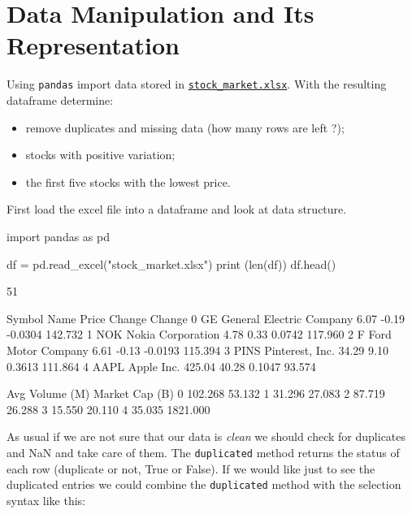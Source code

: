 \chapter{Data Manipulation and Its Representation}
\label{ex-datamanip}

\begin{question}
Using \texttt{pandas} import data stored in \href{https://drive.google.com/file/d/1Uu9lQorvzM-1xwRKPNszaSqlCYAiY-gr/view?usp=sharing}{\texttt{stock\_market.xlsx}}. With the resulting dataframe determine:
\begin{itemize}
\item remove duplicates and missing data (how many rows are left ?);
\item stocks with positive variation;
\item the first five stocks with the lowest price.
\end{itemize}
\end{question}

\begin{solution}
First load the excel file into a dataframe and look at data structure.
\end{solution}

\begin{ipython}
import pandas as pd

df = pd.read_excel("stock_market.xlsx")
print (len(df))
df.head()

51

  Symbol                      Name   Price  Change  Change%
0     GE  General Electric Company    6.07   -0.19  -0.0304     142.732
1    NOK         Nokia Corporation    4.78    0.33   0.0742     117.960
2      F        Ford Motor Company    6.61   -0.13  -0.0193     115.394
3   PINS           Pinterest, Inc.   34.29    9.10   0.3613     111.864
4   AAPL                Apple Inc.  425.04   40.28   0.1047      93.574

   Avg Volume (M)  Market Cap (B)
0         102.268          53.132
1          31.296          27.083
2          87.719          26.288
3          15.550          20.110
4          35.035        1821.000
\end{ipython}
        
As usual if we are not sure that our data is \emph{clean} we should check for duplicates and NaN and take care of them. The \texttt{duplicated} method returns the status of each row (duplicate or not, True or False). If we would like just to see the duplicated entries we could combine the \texttt{duplicated} method with the selection syntax like this:

